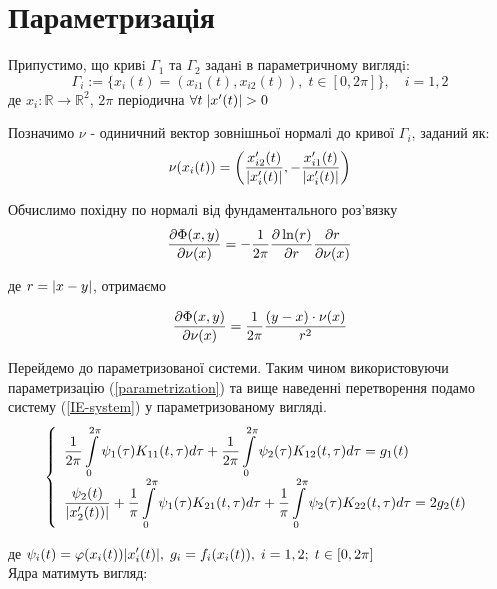 \documentclass[14pt,a4paper]{extarticle}
\newcounter{e}
\numberwithin{equation}{section}
\newcommand{\intl}{\int\limits}
\newcommand{\inttwopi}{\intl_{0}^{2\pi}}
\begin{document}
 \newpage
 \thispagestyle{empty}
 \section{Параметризація}

 Припустимо, що кривi $\Gamma_{1}$ та $\Gamma_{2}$ заданi в параметричному виглядi:
\begin{equation}
	\label{parametrization}
	 \Gamma_{i} := \{ x_{i}(t) = (x_{i1}(t), x_{i2}(t)), \; t \in [ 0, 2\pi ] \} , \quad i = 1, 2
\end{equation}
\indent де $x_{i} : \mathbb{R} \rightarrow \mathbb{R}^2$, $2\pi$ періодична $\forall{t} \; \abs{x'(t)} > 0$ 

Позначимо $\nu$ - одиничний вектор зовнішньої нормалі до кривої $\Gamma_{i}$, заданий як:
\begin{equation}
	\nu(x_i(t)) = \left(
	\frac{
		x'_{i2}(t)}{\abs{x'_{i}(t)}
	},
	- \frac{
	x'_{i1}(t)}{\abs{x'_{i}(t)}}
	\right)
\end{equation}

Обчислимо похідну по нормалі від фундаментального роз'вязку
$$
\pdv{\Phi(x, y)}{\nu(x)} = -\frac{1}{2\pi} \pdv{\ln(r)}{r}\pdv{r}{\nu(x)}
$$

\indent де $r = \abs{x - y}$, отримаємо

\begin{equation}
	\pdv{\Phi(x, y)}{\nu(x)} = \frac{1}{2\pi} \frac{(y - x) \cdot \nu(x)}{r^2} 
\end{equation}


Перейдемо до параметризованої системи. Таким чином використовуючи параметризацію (\ref{parametrization}) та вище наведенні перетворення подамо систему (\ref{IE-system}) у параметризованому вигляді.
\begin{equation}
\label{IE-parametrized-with-specia}
	\left\{
	\begin{array}{l}
		\displaystyle
		\frac{1}{2\pi} \inttwopi \psi_1(\tau) K_{11}(t, \tau) d \tau
		+ \frac{1}{2\pi} \inttwopi  \psi_2(\tau) K_{12}(t, \tau) d \tau
		= g_{1}(t)
		\\ [0.3cm]
		\displaystyle
		\frac{\psi_2(t)}{\abs{x'_{2}(t)) }}
		+ \frac{1}{\pi} \inttwopi \psi_1(\tau) K_{21}(t, \tau) d \tau
		+ \frac{1}{\pi} \inttwopi  \psi_2(\tau) K_{22}(t, \tau) d \tau
		= 2g_{2}(t)
	\end{array}\right.
\end{equation}

де $\displaystyle \psi_{i}(t) = \varphi(x_{i}(t)) \abs{x'_{i}(t)}, \; g_{i} = f_{i}(x_{i}(t)), \;  i  = 1, 2; \; t \in [0, 2\pi]$ \\[0.3cm]
Ядра матимуть вигляд:
\end{document}
